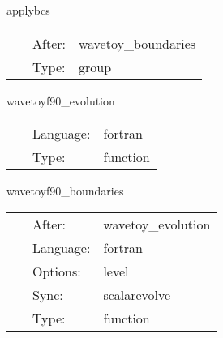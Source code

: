 \hspace{5mm} applybcs 

\hspace{5mm}{\it apply boundary conditions } 


\hspace{5mm}

 \begin{tabular*}{160mm}{cll} 
~ & After:  & wavetoy\_boundaries \\ 
~ & Type:  & group \\ 
\end{tabular*} 


\vspace{5mm}


\hspace{5mm} wavetoyf90\_evolution 

\hspace{5mm}{\it evolution of 3d wave equation } 


\hspace{5mm}

 \begin{tabular*}{160mm}{cll} 
~ & Language:  & fortran \\ 
~ & Type:  & function \\ 
\end{tabular*} 


\vspace{5mm}


\hspace{5mm} wavetoyf90\_boundaries 

\hspace{5mm}{\it boundaries of 3d wave equation } 


\hspace{5mm}

 \begin{tabular*}{160mm}{cll} 
~ & After:  & wavetoy\_evolution \\ 
~ & Language:  & fortran \\ 
~ & Options:  & level \\ 
~ & Sync:  & scalarevolve \\ 
~ & Type:  & function \\ 
\end{tabular*} 


\vspace{5mm}


